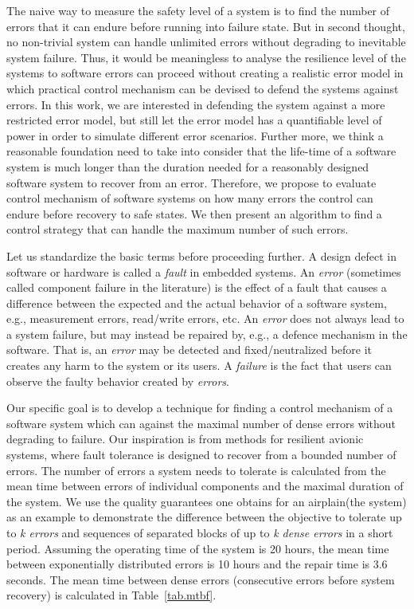 The naive way to measure the safety level of a system is to find the number of errors that it can endure before running into failure state.
But in second thought, no non-trivial system can handle unlimited errors without degrading to inevitable system failure.
Thus, it would be meaningless to analyse the resilience level of the systems to software errors can proceed without creating a realistic error model in which practical control mechanism can be devised to defend the systems against errors.
In this work, we are interested in defending the system against a more restricted error model, but still let the error model has a quantifiable level of power in order to simulate different error scenarios.
Further more, we think a reasonable foundation need to take into consider that the life-time of a software system is much longer than the duration needed for a reasonably designed software system to recover from an error.
Therefore, we propose to evaluate control mechanism of software systems on how many errors the control can endure before recovery to safe states.
We then present an algorithm to find a control strategy that can handle the maximum number of such errors.

Let us standardize the basic terms before proceeding further.
A design defect in software or hardware is called a {\it fault} in embedded systems.
An {\it error} (sometimes called component failure in the literature) is the effect of a fault that causes a difference between the expected and the actual behavior of a software system, e.g., measurement errors, read/write errors, etc. 
An {\it error} does not always lead to a system failure, but may instead be repaired by, e.g., a defence mechanism in the software. 
That is, an {\it error} may be detected and fixed/neutralized before it creates any harm to the system or its users.
A {\it failure} is the fact that users can observe the faulty behavior created by {\it errors}.

Our specific goal is to develop a technique for finding a control mechanism of a software system which can against the maximal number of dense errors without degrading to failure.
Our inspiration is from methods for resilient avionic systems\cite{conf/ftrtft/1992}, where fault tolerance is designed to recover from a bounded number of errors.
The number of errors a system needs to tolerate is calculated from the mean time between errors of individual components and the maximal duration of the system.
We use the quality guarantees one obtains for an airplain(the system) as an example to demonstrate the difference between the objective to tolerate up to {\it k errors} and sequences of separated blocks of up to {\it k dense errors} in a short period.
Assuming the operating time of the system is 20 hours, the mean time between exponentially distributed errors is 10 hours and the repair time is 3.6 seconds.
The mean time between dense errors (consecutive errors before system recovery) is calculated in Table~\ref{tab.mtbf}.




